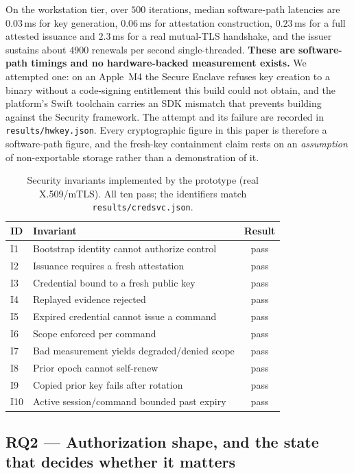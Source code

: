 On the workstation tier, over $500$ iterations, median software-path latencies are $0.03$\,ms for
key generation, $0.06$\,ms for attestation construction, $0.23$\,ms for a full attested issuance
and $2.3$\,ms for a real mutual-TLS handshake, and the issuer sustains about $4900$ renewals per
second single-threaded. \textbf{These are software-path timings and no hardware-backed measurement
exists.} We attempted one: on an Apple~M4 the Secure Enclave refuses key creation to a binary
without a code-signing entitlement this build could not obtain, and the platform's Swift toolchain
carries an SDK mismatch that prevents building against the Security framework. The attempt and its
failure are recorded in \texttt{results/hwkey.json}. Every cryptographic figure in this paper is
therefore a software-path figure, and the fresh-key containment claim rests on an
\emph{assumption} of non-exportable storage rather than a demonstration of it.

\begin{table}[t]
\centering
\caption{Security invariants implemented by the prototype (real X.509/mTLS). All ten pass; the
identifiers match \texttt{results/credsvc.json}.}
\label{tab:invariants}
\small
\begin{tabular}{@{}p{}p{}c@{}}
\toprule
ID & Invariant & Result \\
\midrule
I1 & Bootstrap identity cannot authorize control & pass \\
I2 & Issuance requires a fresh attestation & pass \\
I3 & Credential bound to a fresh public key & pass \\
I4 & Replayed evidence rejected & pass \\
I5 & Expired credential cannot issue a command & pass \\
I6 & Scope enforced per command & pass \\
I7 & Bad measurement yields degraded/denied scope & pass \\
I8 & Prior epoch cannot self-renew & pass \\
I9 & Copied prior key fails after rotation & pass \\
I10 & Active session/command bounded past expiry & pass \\
\bottomrule
\end{tabular}
\end{table}

\subsection{RQ2 --- Authorization shape, and the state that decides whether it matters}

